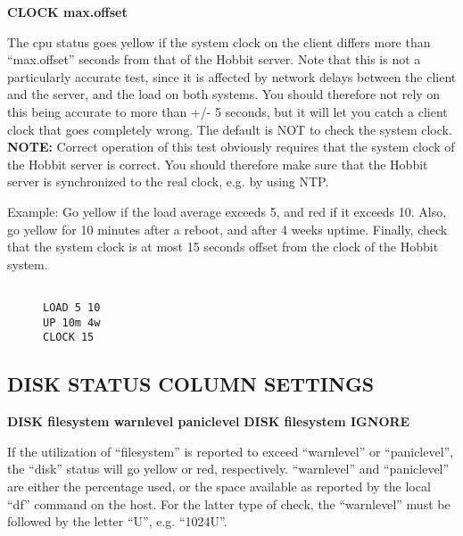  


 \textbf{CLOCK max.offset}



  The cpu status goes yellow if the system clock on the client differs more than ``max.offset'' seconds from that of the Hobbit server. Note that this is not a particularly accurate test, since it is affected by network delays between the client and the server, and the load on both systems. You should therefore not rely on this being accurate to more than +/- 5 seconds, but it will let you catch a client clock that goes completely wrong. The default is NOT to check the system clock.  
\textbf{NOTE:}
 Correct operation of this test obviously requires that the system clock of the Hobbit server is correct. You should therefore make sure that the Hobbit server is synchronized to the real clock, e.g. by using NTP. 


 


  Example: Go yellow if the load average exceeds 5, and red if it exceeds 10. Also, go yellow for 10 minutes after a reboot, and after 4 weeks uptime. Finally, check that the system clock is at most 15 seconds offset from the clock of the Hobbit system. \begin{description}
\item[]\begin{verbatim}

LOAD 5 10
UP 10m 4w
CLOCK 15

\end{verbatim}


\end{description}



 


 
\subsection{DISK STATUS COLUMN SETTINGS}


 \textbf{DISK filesystem warnlevel paniclevel}
 \textbf{DISK filesystem IGNORE}



  If the utilization of ``filesystem'' is reported to exceed ``warnlevel'' or ``paniclevel'', the ``disk'' status will go yellow or red, respectively. ``warnlevel'' and ``paniclevel'' are either the percentage used, or the space available as reported by the local ``df'' command on the host. For the latter type of check, the ``warnlevel'' must be followed by the letter ``U'', e.g. ``1024U''. 


